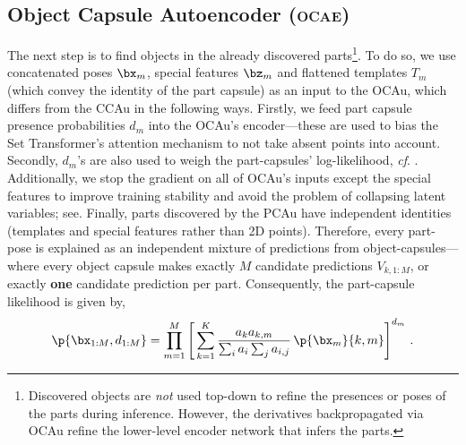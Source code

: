 \subsection{Object Capsule Autoencoder (\textsc{ocae})}
\label{sec:ocae}

The next step is to find objects in the already discovered parts\footnote{
    Discovered objects are {\it not} used top-down to refine the presences or poses of the parts during inference. However, the derivatives backpropagated via \gls{OCAu} refine the lower-level encoder network that infers the parts.
}.
To do so, we use concatenated poses $\bx_m$, special features $\bz_m$ and flattened templates $T_m$ (which convey the identity of the part capsule)
as an input to the \gls{OCAu}, which differs from the \gls{CCAu} in the following ways.
Firstly, we feed part capsule presence probabilities $d_m$ into the \gls{OCAu}'s encoder---these are used to bias the Set Transformer's attention mechanism to not take absent points into account.
Secondly, $d_m$'s are also used to weigh the part-capsules' log-likelihood, \textit{cf}. .
Additionally, we stop the gradient on all of \gls{OCAu}'s inputs except the special features to improve training stability and avoid the problem of collapsing latent variables; see\eg \cite{Rasmus2015ladder}.
Finally, parts discovered by the \gls{PCAu} have independent identities (templates and special features rather than 2D points).
Therefore, every part-pose is explained as an independent mixture of predictions from object-capsules---where every object capsule makes exactly $M$ candidate predictions $V_{k,1:M}$, or exactly {\bf one} candidate prediction per part.
Consequently, the part-capsule likelihood is given by,
\begin{equation}
    \p{\bx_{1:M}, d_{1:M}} = \prod_{m=1}^M \left[\, \sum_{k=1}^K  
    \frac{a_k a_{k,m}}{\sum_i a_i \sum_j a_{i,j}}
    \,\p{\bx_m}{k,m}\right]^{d_m}\,. \label{eq:mod_constellation_likelihood}
\end{equation}

